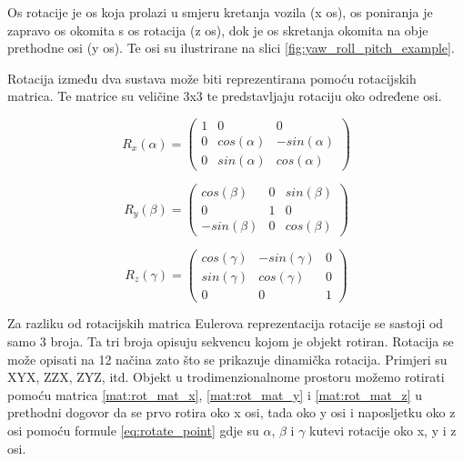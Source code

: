Os rotacije je os koja prolazi u smjeru kretanja vozila (x os), os poniranja je zapravo os okomita s os rotacija (z os), dok je os skretanja okomita na obje prethodne osi (y os). Te osi su ilustrirane na slici \ref{fig:yaw_roll_pitch_example}.

Rotacija između dva sustava može biti reprezentirana pomoću rotacijskih matrica. Te matrice su veličine 3x3 te predstavljaju rotaciju oko određene osi.

\begin{equation}
  R_{x}(\alpha) =
  \begin{pmatrix}
    1 & 0 & 0\\
    0 & cos(\alpha) & -sin(\alpha)\\
    0 & sin(\alpha) & cos(\alpha)
  \end{pmatrix}
  \label{mat:rot_mat_x}
\end{equation}

\begin{equation}
  R_{y}(\beta) =
  \begin{pmatrix}
    cos(\beta) & 0 & sin(\beta)\\
    0 & 1 & 0\\
    -sin(\beta) & 0 & cos(\beta)
  \end{pmatrix}
  \label{mat:rot_mat_y}
\end{equation}

\begin{equation}
  R_{z}(\gamma) =
  \begin{pmatrix}
    cos(\gamma) & -sin(\gamma) & 0\\
    sin(\gamma) & cos(\gamma) & 0\\
    0 & 0 & 1
  \end{pmatrix}
  \label{mat:rot_mat_z}
\end{equation}

Za razliku od rotacijskih matrica Eulerova reprezentacija rotacije se sastoji od samo 3 broja. Ta tri broja opisuju sekvencu kojom je objekt rotiran. Rotacija se može opisati na 12 načina zato što se prikazuje dinamička rotacija. Primjeri su XYX, ZZX, ZYZ, itd. Objekt u trodimenzionalnome prostoru možemo rotirati pomoću matrica \ref{mat:rot_mat_x}, \ref{mat:rot_mat_y} i \ref{mat:rot_mat_z} u prethodni dogovor da se prvo rotira oko x osi, tada oko y osi i naposljetku oko z osi pomoću formule \ref{eq:rotate_point} gdje su $\alpha$, $\beta$ i $\gamma$ kutevi rotacije oko x, y i z osi.

